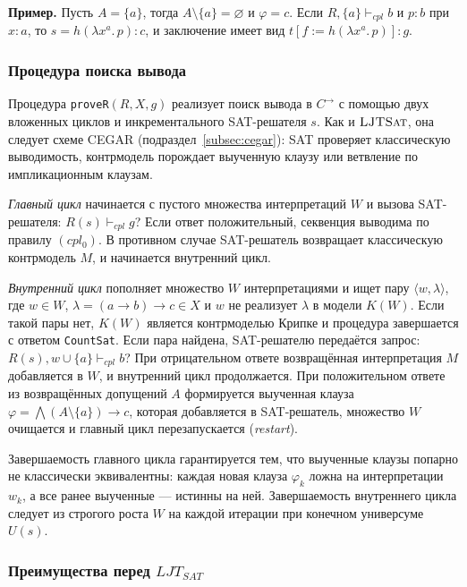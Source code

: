 \documentclass[14pt, russian]{scrartcl}
\begin{document}
\medskip
\noindent
\textbf{Пример.} Пусть $A = \{a\}$, тогда $A \setminus \{a\} = \varnothing$ и
$\varphi = c$. Если $R, \{a\} \vdash_{\mathit{cpl}} b$ и $p : b$ при $x : a$,
то $s = h(\lambda x^a.\, p) : c$, и заключение имеет вид
$t[f := h(\lambda x^a.\, p)] : g$.

\subsubsection{Процедура поиска вывода}
\label{subsec:carrow-prover}

Процедура \texttt{proveR}$(R, X, g)$ реализует поиск вывода в $C^{\rightarrow}$
с помощью двух вложенных циклов и инкрементального SAT-решателя $s$. Как и
$\textsc{LJTSat}$, она следует схеме CEGAR (подраздел~\ref{subsec:cegar}): SAT
проверяет классическую выводимость, контрмодель порождает выученную клаузу или
ветвление по импликационным клаузам.

\emph{Главный цикл} начинается с пустого множества интерпретаций $W$ и вызова
SAT-решателя: $R(s) \vdash_{\mathit{cpl}} g$? Если ответ положительный,
секвенция выводима по правилу $(cpl_0)$. В противном случае SAT-решатель
возвращает классическую контрмодель $M$, и начинается внутренний цикл.

\emph{Внутренний цикл} пополняет множество $W$ интерпретациями и ищет пару
$\langle w, \lambda \rangle$, где $w \in W$, $\lambda = (a \rightarrow b)
\rightarrow c \in X$ и $w$ не реализует $\lambda$ в модели $K(W)$. Если такой
пары нет, $K(W)$ является контрмоделью Крипке и процедура завершается с ответом
\texttt{CountSat}. Если пара найдена, SAT-решателю передаётся запрос:
$R(s), w \cup \{a\} \vdash_{\mathit{cpl}} b$? При отрицательном ответе
возвращённая интерпретация $M$ добавляется в $W$, и внутренний цикл продолжается.
При положительном ответе из возвращённых допущений $A$ формируется выученная
клауза $\varphi = \bigwedge(A \setminus \{a\}) \rightarrow c$, которая
добавляется в SAT-решатель, множество $W$ очищается и главный цикл
перезапускается (\emph{restart}).

Завершаемость главного цикла гарантируется тем, что выученные клаузы попарно
не классически эквивалентны: каждая новая клауза $\varphi_k$ ложна на
интерпретации $w_k$, а все ранее выученные --- истинны на ней. Завершаемость
внутреннего цикла следует из строгого роста $W$ на каждой итерации при конечном
универсуме $U(s)$.

\subsubsection{Преимущества перед $LJT_{SAT}$}
\end{document}
